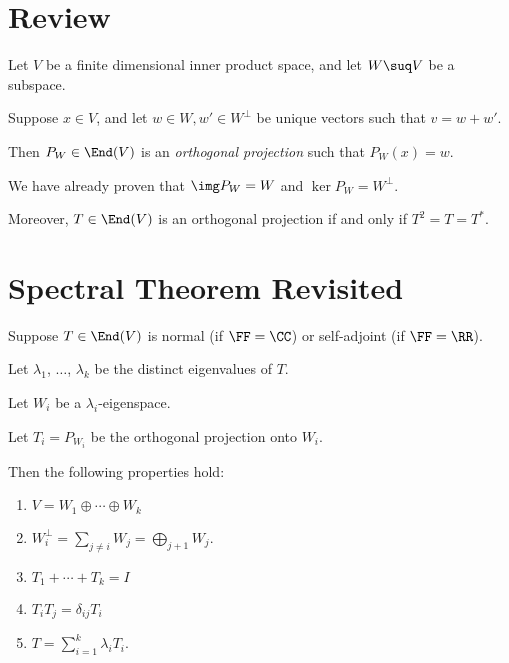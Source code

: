 \documentclass[11pt]{scrartcl}
\begin{document}
\section{Review}

Let $V$ be a finite dimensional inner product space, and let $W\suq V$
be a subspace.

Suppose $x\in V$, and let $w \in W, w'\in W^{\bot}$ be unique vectors
such that $v = w + w'$.

Then $P_W \in \End(V)$ is an \textit{orthogonal projection} such that
$P_W(x) = w$.

We have already proven that $\img P_W=W$ and $\ker P_W = W^{\bot}$.

Moreover, $T \in \End(V)$ is an orthogonal projection if and only if
$T^2= T = T^{*}$.

\section{Spectral Theorem Revisited}

\begin{theorem}
  \label{sec:spectr-theor-revis}
  Suppose $T \in \End(V)$ is normal (if $\FF = \CC$) or self-adjoint (if $\FF = \RR$).

  Let $\lambda_1$, $\dots$, $\lambda_k$ be the distinct eigenvalues of
  $T$.

  Let $W_i$ be a $\lambda_i$-eigenspace.

  Let $T_i = P_{W_i}$ be the orthogonal projection onto $W_i$.

  Then the following properties hold:

  \begin{enumerate}[label=\alph*)]
  \item $V = W_1\oplus \cdots \oplus W_k$
  \item $W_i^{\bot}  = \sum_{j\neq i}W_j =  \bigoplus_{j+1} W_{j}$.
  \item $T_1+\cdots +T_k = I$
  \item $T_iT_j = \delta_{ij}T_i$
  \item $T = \sum_{i=1}^k\lambda_iT_i$.
  \end{enumerate}
\end{theorem}
\end{document}
